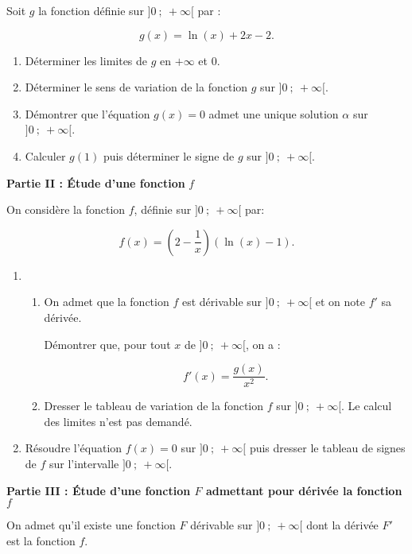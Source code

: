 \documentclass[10pt,a4paper,french]{article}
\begin{document}
Soit $g$ la fonction définie sur $]0~;~+\infty[$ par :

\[g(x) = \ln(x) + 2x - 2.\]

\smallskip

\begin{enumerate}
\item Déterminer les limites de $g$ en $+\infty$ et $0$.
\item Déterminer le sens de variation de la fonction $g$ sur $]0~;~ +\infty[$.
\item Démontrer que l'équation $g(x) = 0$ admet une unique solution $\alpha$ sur $]0~;~ +\infty[$.
\item Calculer $g(1)$ puis déterminer le signe de $g$ sur $]0~;~ +\infty[$.
\end{enumerate}

\bigskip

\textbf{Partie II : Étude d'une fonction } \boldmath $f$\unboldmath

\medskip

On considère la fonction $f$, définie sur $]0~;~ +\infty[$ par:

\[f(x) = \left(2 - \dfrac{1}{x}\right)\left(\ln (x) - 1\right).\]

\begin{enumerate}
\item
	\begin{enumerate}
		\item On admet que la fonction $f$ est dérivable sur $]0~;~ +\infty[$ et on note $f'$ sa dérivée.

Démontrer que, pour tout $x$ de $]0~;~ +\infty[$, on a :

\[f'(x) = \dfrac{g(x)}{x^2}.\]

		\item Dresser le tableau de variation de la fonction $f$ sur $]0~;~ +\infty[$. Le calcul des limites n'est pas demandé.
	\end{enumerate}
\item  Résoudre l'équation $f(x) = 0$ sur $]0~;~ +\infty[$ puis dresser le tableau de signes de $f$ sur l'intervalle $]0~;~ +\infty[$.
\end{enumerate}

\bigskip

\textbf{Partie III : Étude d'une fonction \boldmath $F$\unboldmath{} admettant pour dérivée la fonction \boldmath $f$\unboldmath}

\medskip

On admet qu'il existe une fonction $F$ dérivable sur $]0~;~ +\infty[$ dont la dérivée $F'$ est la fonction $f$.
\end{document}
